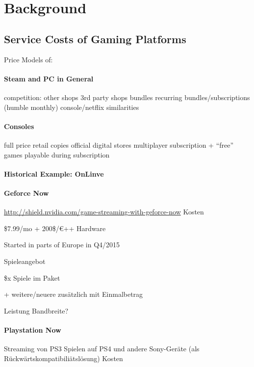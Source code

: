 \section{Background}
\label{sec:background}


\subsection{Service Costs of Gaming Platforms}

Price Models of:

\paragraph{Steam and PC in General}

competition:
other shops
3rd party shops
bundles
recurring bundles/subscriptions (humble monthly)
	console/netflix similarities


\paragraph{Consoles}
full price retail copies
official digital stores
multiplayer subscription + ``free'' games playable during subscription

\paragraph{Historical Example: OnLinve}


\paragraph{Geforce Now}
\url{http://shield.nvidia.com/game-streaming-with-geforce-now}
Kosten

\$7.99/mo + 200\$/€++ Hardware

Started in parts of Europe in Q4/2015

Spieleangebot

\$x Spiele im Paket

 + weitere/neuere zusätzlich mit Einmalbetrag

Leistung
Bandbreite? 

\paragraph{Playstation Now}
Streaming von PS3 Spielen auf PS4 und andere Sony-Geräte (als Rückwärtskompatibiliätslösung)
Kosten

